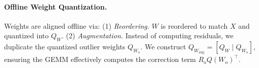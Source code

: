 \documentclass[11pt]{article}
\begin{document}
\paragraph{Offline Weight Quantization.} Weights are aligned offline via: (1) \textit{Reordering.} $W$ is reordered to match $X$ and quantized into $Q_W$. (2) \textit{Augmentation.} Instead of computing residuals, we duplicate the quantized outlier weights $Q_{W_{\text{o}}}$. We construct $Q_{W_{\text{aug}}} = [Q_W \mid Q_{W_{\text{o}}}]$, ensuring the GEMM effectively computes the correction term $R_{\text{o}} Q(W_{\text{o}})^\top$.


\end{document}
